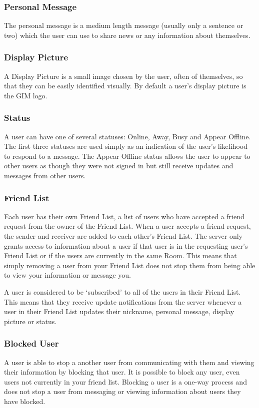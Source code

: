 \subsubsection{Personal Message}
The personal message is a medium length message (usually only a sentence or two) which the user can use to share news or any information about themselves.

\subsubsection{Display Picture}
A Display Picture is a small image chosen by the user, often of themselves, so that they can be easily identified visually. By default a user's display picture is the GIM logo. 

\subsubsection{Status}
A user can have one of several statuses: Online, Away, Busy and Appear Offline. The first three statuses are used simply as an indication of the user's likelihood to respond to a message. The Appear Offline status allows the user to appear to other users as though they were not signed in but still receive updates and messages from other users.

\subsubsection{Friend List}
Each user has their own Friend List, a list of users who have accepted a friend request from the owner of the Friend List. When a user accepts a friend request, the sender and receiver are added to each other's Friend List. The server only grants access to information about a user if that user is in the requesting user's Friend List or if the users are currently in the same Room. This means that simply removing a user from your Friend List does not stop them from being able to view your information or message you.

A user is considered to be `subscribed' to all of the users in their Friend List. This means that they receive update notifications from the server whenever a user in their Friend List updates their nickname, personal message, display picture or status.

\subsubsection{Blocked User}
A user is able to stop a another user from communicating with them and viewing their information by blocking that user. It is possible to block any user, even users not currently in your friend list. Blocking a user is a one-way process and does not stop a user from messaging or viewing information about users they have blocked.

